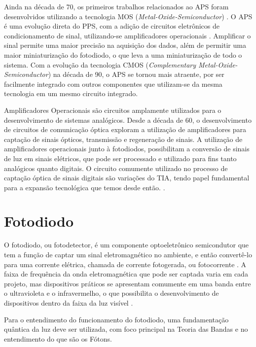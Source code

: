 Ainda na d\'ecada de 70, os primeiros trabalhos relacionados ao APS foram desenvolvidos utilizando a tecnologia MOS (\textit{Metal-Oxide-Semiconductor}) \cite{Peter}. O APS \'e uma evolução direta do PPS, com a adição de circuitos eletrônicos de condicionamento de sinal, utilizando-se amplificadores operacionais \cite{EstevaoCoelho}. Amplificar o sinal permite uma maior precisão na aquisição dos dados, al\'em de permitir uma maior miniaturização do fotodiodo, o que leva a uma miniaturização de todo o sistema. Com a evolução da tecnologia CMOS (\textit{Complementary Metal-Oxide-Semiconductor}) na d\'ecada de 90, o APS se tornou mais atraente, por ser facilmente integrado com outros componentes que utilizam-se da mesma tecnologia em um mesmo circuito integrado.

Amplificadores Operacionais são circuitos amplamente utilizados para o desenvolvimento de sistemas analógicos. Desde a década de 60, o desenvolvimento de circuitos de comunicação óptica exploram a utilização de amplificadores para captação de sinais ópticos, transmissão e regeneração de sinais. A utilização de amplificadores operacionais junto à fotodiodos, possibilitam a conversão de sinais de luz em sinais elétricos, que pode ser processado e utilizado para fins tanto analógicos quanto digitais. O circuito comumente utilizado no processo de captação óptica de sinais digitais são variações do TIA, tendo papel fundamental para a expansão tecnológica que temos desde então. \cite{ajoy, andrefontoura}.

\section{Fotodiodo}

O fotodiodo, ou fotodetector, \'e um componente optoeletrônico semicondutor que tem a função de captar um sinal eletromagn\'etico no ambiente, e então convertê-lo para uma corrente el\'etrica, chamada de corrente fotogerada, ou fotocorrente \cite{RazaviOpt}. A faixa de frequência da onda eletromagnética que pode ser captada varia em cada projeto, mas dispositivos práticos se apresentam comumente em uma banda entre o ultravioleta e o infravermelho, o que possibilita o desenvolvimento de dispositivos dentro da faixa da luz visível \cite{LidianeCampos}.

Para o entendimento do funcionamento do fotodiodo, uma fundamentação quântica da luz deve ser utilizada, com foco principal na Teoria das Bandas e no entendimento do que são os Fótons.

